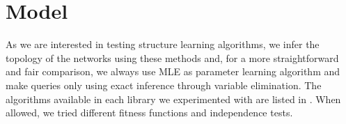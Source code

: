 \documentclass[letterpaper]{article}
\begin{document}


\section{Model}

As we are interested in testing structure learning algorithms, 
we infer the topology of the networks using these methods and, 
for a more straightforward and fair comparison, we always use MLE as parameter learning algorithm and
make queries only using exact inference through variable elimination.
The algorithms available in each library we experimented with are listed in .
When allowed, we tried different fitness functions and independence tests.
\end{document}
